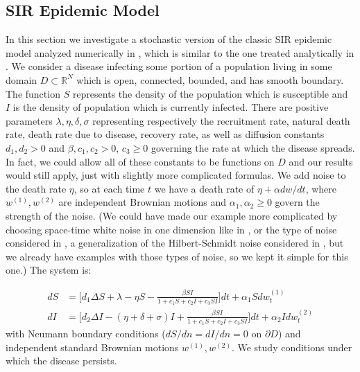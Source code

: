 \documentclass[final]{amsart}
\numberwithin{thm}{section}
\numberwithin{equation}{section}
\newcommand{\R}{\mathbb{R}}
\begin{document}
\subsection{SIR Epidemic Model}\label{example-SIR}
In this section we investigate a stochastic version of the classic SIR epidemic model analyzed numerically in \cite{stochastic-SIR}, which is similar to the one treated analytically in \cite{stochastic-SIR-analytical}.
We consider a disease infecting some portion of a population living in some domain $D \subset \R^N$ which is open, connected, bounded, and has smooth boundary. The function $S$ represents the density of the population which is susceptible and $I$ is the density of population which is currently infected. There are positive parameters $\lambda, \eta, \delta, \sigma$ representing  respectively the recruitment rate, natural death rate, death rate due to disease, recovery rate, as well as diffusion constants $d_1,d_2 > 0$ and $\beta, c_1, c_2 > 0$, $c_3 \geq 0$ governing the rate at which the disease spreads. In fact, we could allow all of these constants to be functions on $D$ and our results would still apply, just with slightly more complicated formulas. We add noise to the death rate $\eta$, so at each time $t$ we have a death rate of $\eta + \alpha dw/dt$, where $w^{(1)}, w^{(2)}$ are independent Brownian motions and $\alpha_1, \alpha_2 \geq 0$ govern the strength of the noise. (We could have made our example more complicated by choosing space-time white noise in one dimension like in , or the type of noise considered in , a generalization of the Hilbert-Schmidt noise considered in \cite{stochastic-SIR-NN}, but we already have examples with those types of noise, so we kept it simple for this one.)  The system is:


\begin{equation}\label{SIR}
    \begin{aligned}
        dS &= \Big[d_1\Delta S + \lambda - \eta S - \frac{\beta SI}{1 + c_1S + c_2I + c_3SI}\Big]dt + \alpha_1 Sdw^{(1)}_t \\
        dI &= \Big[d_2\Delta I - (\eta + \delta + \sigma) I + \frac{\beta SI}{1 + c_1S + c_2I + c_3SI}\Big]dt + \alpha_2 Idw^{(2)}_t
    \end{aligned}
\end{equation} with Neumann boundary conditions ($dS/dn = dI/dn = 0$ on $\partial D$) and independent standard Brownian motions $w^{(1)}, w^{(2)}$. We study conditions under which the disease persists.
\end{document}
